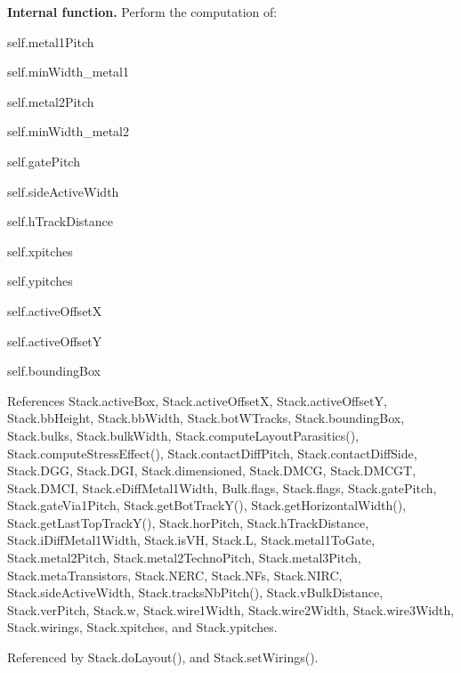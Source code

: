 {\bfseries Internal function.} Perform the computation of\+:
\begin{DoxyItemize}
\item {\ttfamily self.\+metal1\+Pitch} 
\item {\ttfamily self.\+min\+Width\+\_\+metal1} 
\item {\ttfamily self.\+metal2\+Pitch} 
\item {\ttfamily self.\+min\+Width\+\_\+metal2} 
\item {\ttfamily self.\+gate\+Pitch} 
\item {\ttfamily self.\+side\+Active\+Width} 
\item {\ttfamily self.\+h\+Track\+Distance} 
\item {\ttfamily self.\+xpitches} 
\item {\ttfamily self.\+ypitches} 
\item {\ttfamily self.\+active\+OffsetX} 
\item {\ttfamily self.\+active\+OffsetY} 
\item {\ttfamily self.\+bounding\+Box} 
\end{DoxyItemize}

References Stack.\+active\+Box, Stack.\+active\+OffsetX, Stack.\+active\+OffsetY, Stack.\+bb\+Height, Stack.\+bb\+Width, Stack.\+bot\+W\+Tracks, Stack.\+bounding\+Box, Stack.\+bulks, Stack.\+bulk\+Width, Stack.\+compute\+Layout\+Parasitics(), Stack.\+compute\+Stress\+Effect(), Stack.\+contact\+Diff\+Pitch, Stack.\+contact\+Diff\+Side, Stack.\+D\+GG, Stack.\+D\+GI, Stack.\+dimensioned, Stack.\+D\+M\+CG, Stack.\+D\+M\+C\+GT, Stack.\+D\+M\+CI, Stack.\+e\+Diff\+Metal1\+Width, Bulk.\+flags, Stack.\+flags, Stack.\+gate\+Pitch, Stack.\+gate\+Via1\+Pitch, Stack.\+get\+Bot\+Track\+Y(), Stack.\+get\+Horizontal\+Width(), Stack.\+get\+Last\+Top\+Track\+Y(), Stack.\+hor\+Pitch, Stack.\+h\+Track\+Distance, Stack.\+i\+Diff\+Metal1\+Width, Stack.\+is\+VH, Stack.\+L, Stack.\+metal1\+To\+Gate, Stack.\+metal2\+Pitch, Stack.\+metal2\+Techno\+Pitch, Stack.\+metal3\+Pitch, Stack.\+meta\+Transistors, Stack.\+N\+E\+RC, Stack.\+N\+Fs, Stack.\+N\+I\+RC, Stack.\+side\+Active\+Width, Stack.\+tracks\+Nb\+Pitch(), Stack.\+v\+Bulk\+Distance, Stack.\+ver\+Pitch, Stack.\+w, Stack.\+wire1\+Width, Stack.\+wire2\+Width, Stack.\+wire3\+Width, Stack.\+wirings, Stack.\+xpitches, and Stack.\+ypitches.



Referenced by Stack.\+do\+Layout(), and Stack.\+set\+Wirings().

\mbox{\label{classpython_1_1Stack_1_1Stack_a2b936db85a32775dd3739ccfdfef636d}} 
